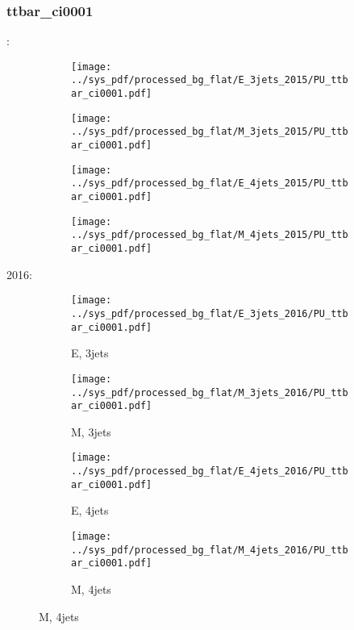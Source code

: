 \documentclass{beamer}
\begin{document}
\begin{frame}
\frametitle{ttbar_ci0001}
\fontsize{5}{1}:
\begin{figure}
\centering
\begin{subfigure}[b]{0.24\textwidth}
\texttt{[image: ../sys\_pdf/processed\_bg\_flat/E\_3jets\_2015/PU\_ttbar\_ci0001.pdf]}
\end{subfigure}
\begin{subfigure}[b]{0.24\textwidth}
\texttt{[image: ../sys\_pdf/processed\_bg\_flat/M\_3jets\_2015/PU\_ttbar\_ci0001.pdf]}
\end{subfigure}
\begin{subfigure}[b]{0.24\textwidth}
\texttt{[image: ../sys\_pdf/processed\_bg\_flat/E\_4jets\_2015/PU\_ttbar\_ci0001.pdf]}
\end{subfigure}
\begin{subfigure}[b]{0.24\textwidth}
\texttt{[image: ../sys\_pdf/processed\_bg\_flat/M\_4jets\_2015/PU\_ttbar\_ci0001.pdf]}
\end{subfigure}
\end{figure}
2016:
\begin{figure}
\centering
\begin{subfigure}[b]{0.24\textwidth}
\texttt{[image: ../sys\_pdf/processed\_bg\_flat/E\_3jets\_2016/PU\_ttbar\_ci0001.pdf]}
\captionsetup{font=tiny}
\caption{E, 3jets}
\end{subfigure}
\begin{subfigure}[b]{0.24\textwidth}
\texttt{[image: ../sys\_pdf/processed\_bg\_flat/M\_3jets\_2016/PU\_ttbar\_ci0001.pdf]}
\captionsetup{font=tiny}
\caption{M, 3jets}
\end{subfigure}
\begin{subfigure}[b]{0.24\textwidth}
\texttt{[image: ../sys\_pdf/processed\_bg\_flat/E\_4jets\_2016/PU\_ttbar\_ci0001.pdf]}
\captionsetup{font=tiny}
\caption{E, 4jets}
\end{subfigure}
\begin{subfigure}[b]{0.24\textwidth}
\texttt{[image: ../sys\_pdf/processed\_bg\_flat/M\_4jets\_2016/PU\_ttbar\_ci0001.pdf]}
\captionsetup{font=tiny}
\caption{M, 4jets}
\end{subfigure}
\end{figure}
\end{frame}
\end{document}
